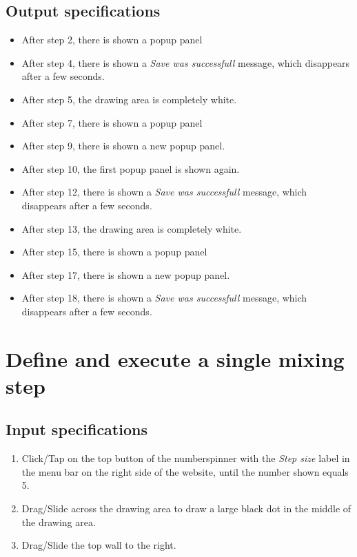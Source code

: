 \subsection*{Output specifications}
\begin{itemize}
\item After step 2, there is shown a popup panel
\item After step 4, there is shown a \emph{Save was successfull} message, which disappears after a few seconds.
\item After step 5, the drawing area is completely white.
\item After step 7, there is shown a popup panel
\item After step 9, there is shown a new popup panel.
\item After step 10, the first popup panel is shown again.
\item After step 12, there is shown a \emph{Save was successfull} message, which disappears after a few seconds.
\item After step 13, the drawing area is completely white.
\item After step 15, there is shown a popup panel
\item After step 17, there is shown a new popup panel.
\item After step 18, there is shown a \emph{Save was successfull} message, which disappears after a few seconds.
\end{itemize}

\section{Define and execute a single mixing step}

\subsection*{Input specifications}
\begin{enumerate}
\item Click/Tap on the top button of the numberspinner with the \emph{Step size} label in the menu bar on the right side of the website, until the number shown equals 5.
\item Drag/Slide across the drawing area to draw a large black dot in the middle of the drawing area.
\item Drag/Slide the top wall to the right.
\end{enumerate}

